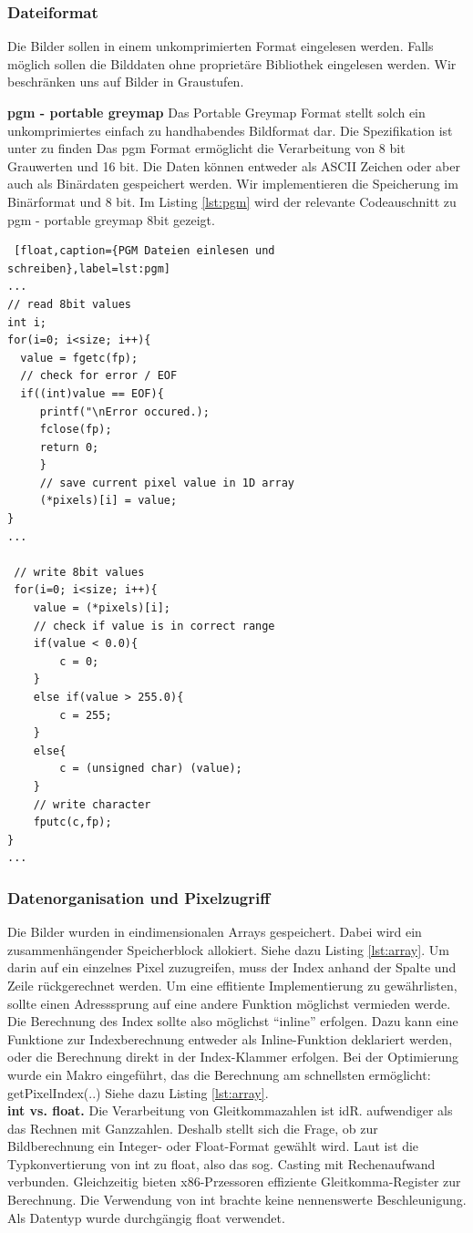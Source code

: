\documentclass[a4paper,12pt]{article}
\begin{document}
\subsubsection{Dateiformat}
Die Bilder sollen in einem unkomprimierten Format eingelesen werden. Falls
möglich sollen die Bilddaten ohne proprietäre Bibliothek eingelesen werden.
Wir beschränken uns auf Bilder in Graustufen.

\textbf{pgm - portable greymap}
Das Portable Greymap Format stellt solch ein unkomprimiertes einfach zu handhabendes
Bildformat dar. Die Spezifikation ist unter \cite{pgm} zu finden
Das pgm Format ermöglicht die Verarbeitung von 8 bit Grauwerten und 16 bit. 
Die Daten können entweder als ASCII Zeichen oder aber auch als Binärdaten
gespeichert werden. Wir implementieren die Speicherung im Binärformat und 8 bit.
Im Listing \ref{lst:pgm} wird der relevante Codeauschnitt zu pgm - portable greymap 8bit gezeigt.

\begin{lstlisting} [float,caption={PGM Dateien einlesen und
schreiben},label=lst:pgm] 
...
// read 8bit values
int i;
for(i=0; i<size; i++){
  value = fgetc(fp);
  // check for error / EOF
  if((int)value == EOF){
     printf("\nError occured.);
     fclose(fp);
     return 0;
     }
     // save current pixel value in 1D array
     (*pixels)[i] = value;
}
...

 // write 8bit values
 for(i=0; i<size; i++){
	value = (*pixels)[i];
	// check if value is in correct range
	if(value < 0.0){
		c = 0;
	}
	else if(value > 255.0){
		c = 255;
	}
	else{
		c = (unsigned char) (value);
	}
	// write character
	fputc(c,fp);
}
...
\end{lstlisting}

\subsubsection{Datenorganisation und Pixelzugriff}
Die Bilder wurden in eindimensionalen Arrays gespeichert. Dabei wird ein
zusammenhängender Speicherblock allokiert. Siehe dazu Listing \ref{lst:array}.
Um darin auf ein einzelnes Pixel zuzugreifen, muss der Index anhand der Spalte
und Zeile rückgerechnet werden. Um eine effitiente Implementierung zu
gewährlisten, sollte einen Adresssprung auf eine andere Funktion möglichst
vermieden werde. Die Berechnung des Index sollte also möglichst "`inline"'
erfolgen. Dazu kann eine Funktione zur Indexberechnung entweder als
Inline-Funktion deklariert werden, oder die Berechnung direkt in der
Index-Klammer erfolgen. Bei der Optimierung wurde ein Makro eingeführt, das die
Berechnung am schnellsten ermöglicht: getPixelIndex(..) Siehe dazu Listing
\ref{lst:array}. \\
\textbf{int vs. float.} Die Verarbeitung von Gleitkommazahlen ist idR.
aufwendiger als das Rechnen mit Ganzzahlen. Deshalb stellt sich die Frage, ob
zur Bildberechnung ein Integer- oder Float-Format gewählt wird. Laut \cite{agner} ist die
Typkonvertierung von int zu float, also das sog. Casting mit Rechenaufwand
verbunden. Gleichzeitig bieten x86-Przessoren effiziente Gleitkomma-Register zur
Berechnung. Die Verwendung von int brachte keine nennenswerte Beschleunigung.
Als Datentyp wurde durchgängig float verwendet. 
\end{document}
